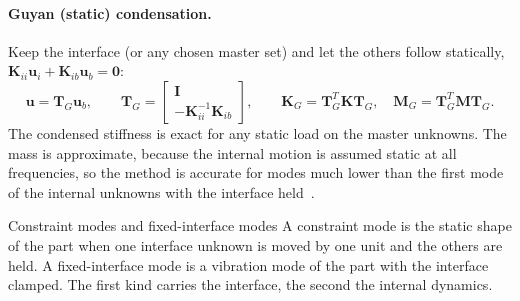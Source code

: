 \paragraph{Guyan (static) condensation.}
Keep the interface (or any chosen master set) and let the others follow statically, $\bm K_{ii}\bm u_i+\bm K_{ib}\bm u_b=\bm 0$:
\begin{equation}\label{eq:cm-guyan}
\bm u=\bm T_G\bm u_b,\qquad \bm T_G=\begin{bmatrix}\bm I\\-\bm K_{ii}^{-1}\bm K_{ib}\end{bmatrix},\qquad \bm K_G=\bm T_G^T\bm K\bm T_G,\quad \bm M_G=\bm T_G^T\bm M\bm T_G .
\end{equation}
The condensed stiffness is exact for any static load on the master unknowns. The mass is approximate, because the internal motion is assumed static at all frequencies, so the method is accurate for modes much lower than the first mode of the internal unknowns with the interface held~\cite{guyan1965}.

\begin{sidenote}{Constraint modes and fixed-interface modes}
A constraint mode is the static shape of the part when one interface unknown is moved by one unit and the others are held. A fixed-interface mode is a vibration mode of the part with the interface clamped. The first kind carries the interface, the second the internal dynamics.
\end{sidenote}

